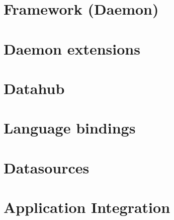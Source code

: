 \section{Framework (Daemon)}
\section{Daemon extensions}
\section{Datahub}
\section{Language bindings}
\section{Datasources}
\section{Application Integration}
